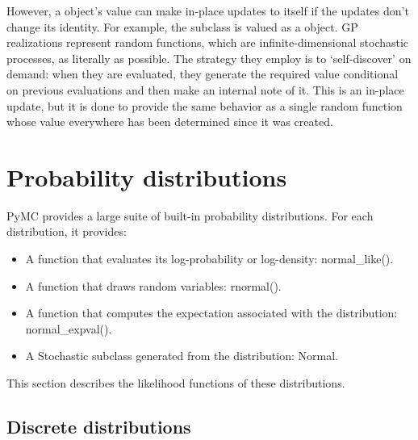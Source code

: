 \documentclass[letterpaper,10pt,english]{sphinxmanual}
\begin{document}
However, a  object's value can make in-place updates to itself if the updates don't change its identity. For example, the  subclass  is valued as a  object. GP realizations represent random functions, which are infinite-dimensional stochastic processes, as literally as possible. The strategy they employ is to `self-discover' on demand: when they are evaluated, they generate the required value conditional on previous evaluations and then make an internal note of it. This is an in-place update, but it is done to provide the same behavior as a single random function whose value everywhere has been determined since it was created.


\chapter{Probability distributions}
\label{distributions:chap-distributions}\label{distributions::doc}\label{distributions:probability-distributions}
PyMC provides a large suite of built-in probability distributions. For each distribution, it provides:
\begin{itemize}
\item {} 
A function that evaluates its log-probability or log-density: normal\_like().

\item {} 
A function that draws random variables: rnormal().

\item {} 
A function that computes the expectation associated with the distribution: normal\_expval().

\item {} 
A Stochastic subclass generated from the distribution: Normal.

\end{itemize}

This section describes the likelihood functions of these distributions.
\label{distributions:module-pymc.distributions}

\section{Discrete distributions}
\label{distributions:discrete-distributions}
\end{document}
